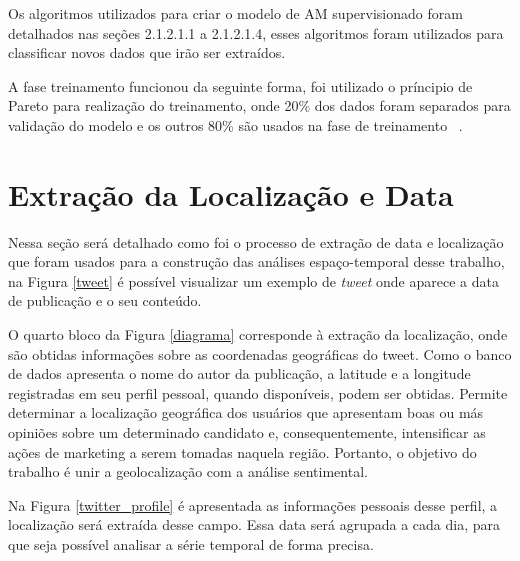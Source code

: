 Os algoritmos utilizados para criar o modelo de \acrshort{AM} supervisionado foram detalhados nas seções 2.1.2.1.1 a 2.1.2.1.4, esses algoritmos foram 
utilizados para classificar novos dados que irão ser extraídos. 

A fase treinamento funcionou da seguinte forma, foi utilizado o príncipio de Pareto para realização do treinamento, onde 20\% dos dados foram 
separados para validação do modelo e os outros 80\% são usados na fase de treinamento ~\cite{jin2008pareto}. 


\section{Extração da Localização e Data}
\label{extract_timestamp}

Nessa seção será detalhado como foi o processo de extração de data e localização que foram usados para a construção das análises espaço-temporal
desse trabalho, na Figura \ref{tweet} é possível visualizar um exemplo de \textit{tweet} onde aparece a data de publicação e o seu conteúdo. 



O quarto bloco da Figura \ref{diagrama} corresponde à extração da
localização, onde são obtidas informações sobre as coordenadas
geográficas do tweet. Como o banco de dados apresenta
o nome do autor da publicação, a latitude e a longitude
registradas em seu perfil pessoal, quando disponíveis, podem
ser obtidas. Permite determinar a localização geográfica dos
usuários que apresentam boas ou más opiniões sobre um
determinado candidato e, consequentemente, intensificar as
ações de marketing a serem tomadas naquela região. Portanto,
o objetivo do trabalho é unir a geolocalização com a análise
sentimental.

%

Na Figura \ref{twitter_profile} é apresentada as informações pessoais desse perfil, a localização será extraída desse campo. Essa data será agrupada 
a cada dia, para que seja possível analisar a série temporal de forma precisa.

%
